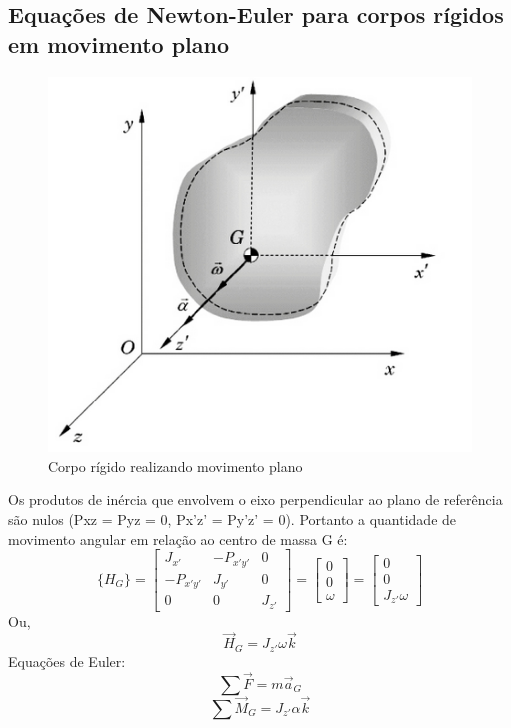 \documentclass[a4paper, 12pt]{article}
\begin{document}
	\subsection{Equações de Newton-Euler para corpos rígidos em movimento plano}
		\begin{figure}[h]
			\center
			\includegraphics[scale=0.5]{imagens/a7.png} 
			\caption{Corpo rígido realizando movimento plano}
		\end{figure}	
		Os produtos de inércia que envolvem o eixo perpendicular ao plano de referência são nulos (Pxz = Pyz = 0, Px’z’ = Py’z’ = 0). Portanto a quantidade de movimento angular em relação ao centro de massa G é:
		\begin{equation}
			\{H_G\} = \begin{bmatrix}
			J_{x'} & -P_{x'y'} &0\\
			-P_{x'y'} & J_{y'} & 0\\
			0 & 0 & J_{z'}
			\end{bmatrix} = \begin{bmatrix}
			0\\0\\ \omega
			\end{bmatrix} = \begin{bmatrix}
			0\\0\\J_{z'}\omega
			\end{bmatrix}
		\end{equation}
		Ou,
		\begin{equation}
			\vec{H}_G = J_{z'}\omega \vec{k}
		\end{equation}
		Equações de Euler:
		\begin{equation}
			\sum\vec{F} = m\vec{a}_G
		\end{equation}
		\begin{equation}
			\sum\vec{M}_G = J_{z'}\alpha \vec{k}
		\end{equation}
\end{document}
